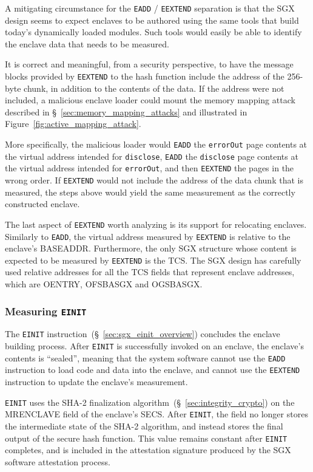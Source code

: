 A mitigating circumstance for the \texttt{EADD} / \texttt{EEXTEND} separation
is that the SGX design seems to expect enclaves to be authored using the same
tools that build today's dynamically loaded modules. Such tools would easily be
able to identify the enclave data that needs to be measured.

It is correct and meaningful, from a security perspective, to have the message
blocks provided by \texttt{EEXTEND} to the hash function include the address of
the 256-byte chunk, in addition to the contents of the data. If the address
were not included, a malicious enclave loader could mount the memory mapping
attack described in \S~\ref{sec:memory_mapping_attacks} and illustrated in
Figure~\ref{fig:active_mapping_attack}.

More specifically, the malicious loader would \texttt{EADD} the
\texttt{errorOut} page contents at the virtual address intended for
\texttt{disclose}, \texttt{EADD} the \texttt{disclose} page contents at the
virtual address intended for \texttt{errorOut}, and then \texttt{EEXTEND} the
pages in the wrong order. If \texttt{EEXTEND} would not include the address of
the data chunk that is measured, the steps above would yield the same
measurement as the correctly constructed enclave.


The last aspect of \texttt{EEXTEND} worth analyzing is its support for
relocating enclaves. Similarly to \texttt{EADD}, the virtual address measured
by \texttt{EEXTEND} is relative to the enclave's BASEADDR. Furthermore, the
only SGX structure whose content is expected to be measured by \texttt{EEXTEND}
is the TCS. The SGX design has carefully used relative addresses for all the
TCS fields that represent enclave addresses, which are OENTRY, OFSBASGX and
OGSBASGX.


\subsubsection{Measuring \texttt{EINIT}}


The \texttt{EINIT} instruction~(\S~\ref{sec:sgx_einit_overview}) concludes the
enclave building process. After \texttt{EINIT} is successfully invoked on an
enclave, the enclave's contents is ``sealed'', meaning that the system software
cannot use the \texttt{EADD} instruction to load code and data into the
enclave, and cannot use the \texttt{EEXTEND} instruction to update the
enclave's measurement.

\texttt{EINIT} uses the SHA-2 finalization
algorithm~(\S~\ref{sec:integrity_crypto}) on the MRENCLAVE field of the
enclave's SECS. After \texttt{EINIT}, the field no longer stores the
intermediate state of the SHA-2 algorithm, and instead stores the final output
of the secure hash function. This value remains constant after \texttt{EINIT}
completes, and is included in the attestation signature produced by the
SGX software attestation process.

